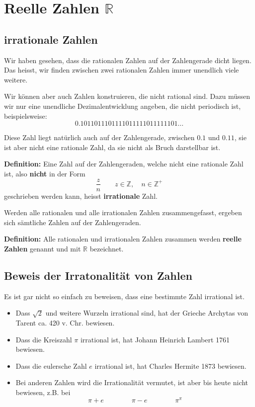 \newpage
\section{Reelle Zahlen $\mathbb{R}$}

\subsection{irrationale Zahlen}

Wir haben gesehen, dass die rationalen Zahlen auf der Zahlengerade dicht liegen. Das heisst, wir finden zwischen zwei rationalen Zahlen immer unendlich viele weitere.

Wir können aber auch Zahlen konstruieren, die nicht rational sind. Dazu müssen wir nur eine unendliche Dezimalentwicklung angeben, die nicht periodisch ist, beispielsweise:
\[
  0.1011011101111011111011111101\ldots
\]

Diese Zahl liegt natürlich auch auf der Zahlengerade, zwischen $0.1$ und $0.11$, sie ist aber nicht eine rationale Zahl, da sie nicht als Bruch darstellbar ist.

\textbf{Definition:} Eine Zahl auf der Zahlengeraden, welche nicht eine rationale Zahl ist, also \textbf{nicht} in der Form
\[
  \frac{z}{n} \qquad z \in \mathbb{Z},\quad n \in \mathbb{Z^{+}}
\]
geschrieben werden kann, heisst \textbf{irrationale} Zahl.

Werden alle rationalen und alle irrationalen Zahlen zusammengefasst, ergeben sich sämtliche Zahlen auf der Zahlengeraden.

\textbf{Definition:} Alle rationalen und irrationalen Zahlen zusammen werden \textbf{reelle Zahlen} genannt und mit $\mathbb{R}$ bezeichnet.

\subsection{Beweis der Irratonalität von Zahlen}

Es ist gar nicht so einfach zu beweisen, dass eine bestimmte Zahl irrational ist.

\begin{itemize}
  \item Dass $\sqrt{2}$ und weitere Wurzeln irrational sind, hat der Grieche Archytas von Tarent ca. 420 v. Chr. bewiesen.
  \item Dass die Kreiszahl $\pi$ irrational ist, hat Johann Heinrich Lambert 1761 bewiesen.
  \item Dass die eulersche Zahl $e$ irrational ist, hat Charles Hermite 1873 bewiesen.
  \item Bei anderen Zahlen wird die Irrationalität vermutet, ist aber bis heute nicht bewiesen, z.B. bei
  \[
    \pi + e \qquad\qquad \pi - e \qquad\qquad \pi^{\pi}
  \]
\end{itemize}

